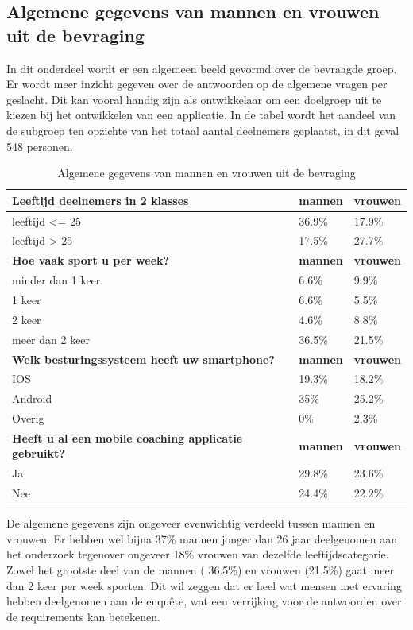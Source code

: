 \subsection{Algemene gegevens  van mannen en vrouwen uit de bevraging}
\label{sec:Resultaten vragenlijst}
In dit onderdeel wordt er een algemeen beeld gevormd over de bevraagde groep. Er wordt meer inzicht gegeven over de antwoorden op de algemene vragen per geslacht. Dit kan vooral handig zijn als ontwikkelaar om een doelgroep uit te kiezen bij het ontwikkelen van een applicatie. In de tabel wordt het aandeel van de subgroep ten opzichte van het totaal aantal deelnemers geplaatst, in dit geval 548 personen. 
\begin{table}[h!]
\begin{center}
\begin{tabular}{ |p{10cm}|p{2cm}|p{2cm}| }
 \hline
 \textbf{Leeftijd deelnemers in 2 klasses} & \textbf{mannen} &\textbf{vrouwen}\\ 
 \hline
 leeftijd <= 25   & 36.9\%    &17.9\%   \\
 leeftijd > 25 &   17.5\%  &27.7\%   \\
 \hline
  \textbf{Hoe vaak sport u per week? } & \textbf{mannen} &\textbf{vrouwen}\\ 
 \hline
 minder dan 1 keer   & 6.6\%   & 9.9\%  \\
 1 keer &   6.6\%  & 5.5\%   \\
 2 keer &   4.6\%& 8.8\%   \\
meer dan 2 keer &  36.5\% & 21.5\%  \\
 \hline
   \textbf{Welk besturingssysteem heeft uw smartphone?}  & \textbf{mannen} &\textbf{vrouwen}\\ 
 \hline
IOS   & 19.3\%   &18.2\%   \\
Android &   35\%  &25.2\%   \\
Overig &   0\%  & 2.3\%  \\
 \hline
    \textbf{Heeft u al een mobile coaching applicatie gebruikt?}  & \textbf{mannen} &\textbf{vrouwen}\\ 
 \hline
Ja   & 29.8\%  &23.6\%   \\
Nee &   24.4\%  &22.2\%   \\
  \hline
\end{tabular}
\end{center}
\caption{Algemene gegevens  van mannen en vrouwen uit de bevraging}
\label{table:1}
\end{table}
\newpage
De algemene gegevens zijn ongeveer evenwichtig verdeeld tussen mannen en vrouwen. Er hebben wel bijna 37\% mannen jonger dan 26 jaar deelgenomen aan het onderzoek tegenover ongeveer 18\% vrouwen van dezelfde leeftijdscategorie. Zowel het grootste deel van de mannen ( 36.5\%) en vrouwen (21.5\%) gaat meer dan 2 keer per week sporten. Dit wil zeggen dat er heel wat mensen met ervaring hebben deelgenomen aan de enquête, wat een verrijking voor de antwoorden over de requirements kan betekenen. 


